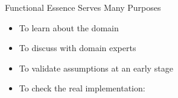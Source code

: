 \begin{frame}[fragile]{Functional Essence Serves Many Purposes}

\begin{itemize}[<+->]
\item To learn about the domain
\item To discuss with domain experts
\item To validate assumptions at an early stage

\vspace{1em}

\item To check the real implementation:
\end{itemize}

\end{frame}


